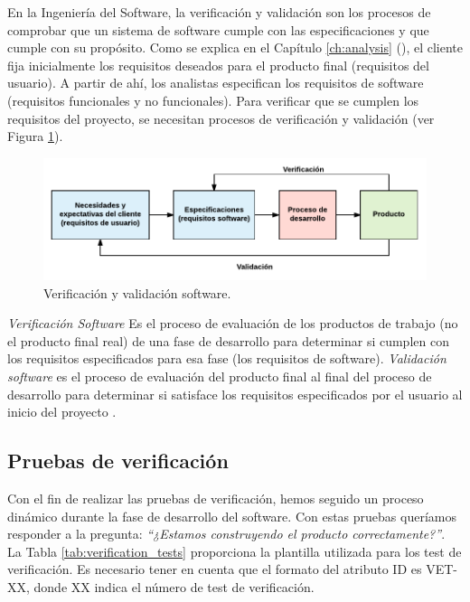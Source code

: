 En la Ingeniería del Software, la verificación y validación son los procesos de comprobar que un sistema de software cumple con las especificaciones y que cumple con su propósito. Como se explica en el Capítulo \ref{ch:analysis} (\textit{}), el cliente fija inicialmente los requisitos deseados para el producto final (requisitos del usuario). A partir de ahí, los analistas especifican los requisitos de software (requisitos funcionales y no funcionales). Para verificar que se cumplen los requisitos del proyecto, se necesitan procesos de verificación y validación (ver Figura \ref{fig:verification_validation}).

\vspace{1cm}

\begin{figure}[htb]
 	\centering
 	\includegraphics[width=12cm]{figures/verificacion_validacion_diagrama}
 	\caption{Verificación y validación software.}
	\label{fig:verification_validation}
\end{figure}

\vspace{1cm}

\textit{Verificación Software} Es el proceso de evaluación de los productos de trabajo (no el producto final real) de una fase de desarrollo para determinar si cumplen con los requisitos especificados para esa fase (los requisitos de software). \textit{Validación software} es el proceso de evaluación del producto final al final del proceso de desarrollo para determinar si satisface los requisitos especificados por el usuario al inicio del proyecto \cite{verification}.

\subsection{Pruebas de verificación}

Con el fin de realizar las pruebas de verificación, hemos seguido un proceso dinámico durante la fase de desarrollo del software. Con estas pruebas queríamos responder a la pregunta: \emph{``¿Estamos construyendo el producto correctamente?''}. La Tabla \ref{tab:verification_tests} proporciona la plantilla utilizada para los test de verificación. Es necesario tener en cuenta que el formato del atributo ID es VET-XX, donde XX indica el número de test de verificación.
\clearpage


